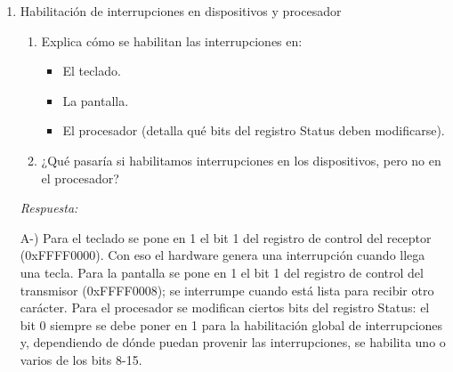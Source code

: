 \documentclass[11pt, a4paper]{article}
\begin{document}
\begin{enumerate}[leftmargin=*, label=\arabic*.]
    \vspace{0.2cm}
    \textit{Respuesta:}

    A-) Las interrupciones son generadas por hardware externo y son asíncronas, ya que pueden suceder en cualquier momento y no tienen que coordinarse con ninguna instrucción, mientras que las excepciones son causadas por la misma instrucción y se consideran síncronas, ya que siempre suceden con la misma o mismas instrucciones.

    B-) Una manera es transferir el control al sistema operativo en una dirección fija, donde, dependiendo de la causa de la excepción, se escoge cómo proceder. La otra manera es mediante interrupciones vectorizadas: cuando se produce la excepción se determina la causa y se transfiere el control directamente a la rutina específica para ese tipo de excepción. En ambos casos se carga en el PC la dirección de la rutina de servicio y se guarda en el EPC la dirección de la instrucción afectada o a la que se debe regresar una vez termine la rutina.
    \vspace{2cm}

    \item Habilitación de interrupciones en dispositivos y procesador
    \begin{enumerate}[label=\alph*)]
        \item Explica cómo se habilitan las interrupciones en:
        \begin{itemize}
            \item El teclado.
            \item La pantalla.
            \item El procesador (detalla qué bits del registro Status deben modificarse).
        \end{itemize}
        \item ¿Qué pasaría si habilitamos interrupciones en los dispositivos, pero no en el procesador?
    \end{enumerate}
    
    \vspace{0.2cm}
    \textit{Respuesta:}

    A-) Para el teclado se pone en 1 el bit 1 del registro de control del receptor (0xFFFF0000). Con eso el hardware genera una interrupción cuando llega una tecla. Para la pantalla se pone en 1 el bit 1 del registro de control del transmisor (0xFFFF0008); se interrumpe cuando está lista para recibir otro carácter. Para el procesador se modifican ciertos bits del registro Status: el bit 0 siempre se debe poner en 1 para la habilitación global de interrupciones y, dependiendo de dónde puedan provenir las interrupciones, se habilita uno o varios de los bits 8-15.


\end{enumerate}
\end{document}
